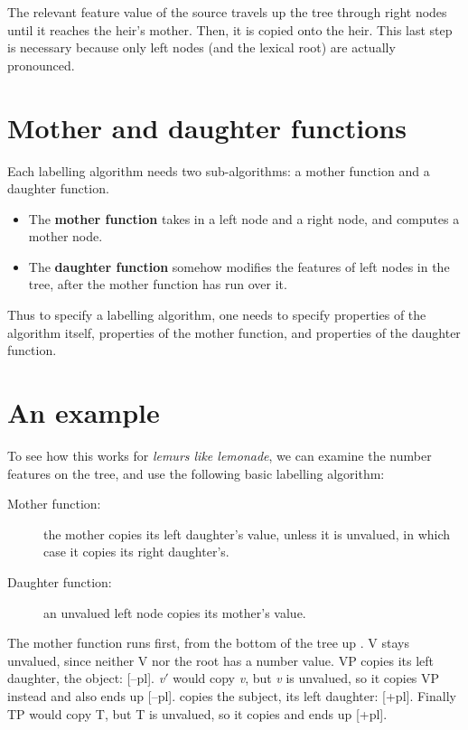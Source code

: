 The relevant feature value of the source travels up the tree through right nodes until it reaches the heir's mother. Then, it is copied onto the heir. This last step is necessary because only left nodes (and the lexical root) are actually pronounced. 

\section{Mother and daughter functions}

Each labelling algorithm needs two sub-algorithms: a mother function and a daughter function.

\begin{itemize}
  \item The \textbf{mother function} takes in a left node and a right node, and computes a mother node.
  \item The \textbf{daughter function} somehow modifies the features of left nodes in the tree, after the mother function has run over it.
\end{itemize}

Thus to specify a labelling algorithm, one needs to specify properties of the algorithm itself, properties of the mother function, and properties of the daughter function. 

\section{An example}\label{sec:labelling-example}

To see how this works for \textit{lemurs like lemonade}, we can examine the number features on the tree, and use the following basic labelling algorithm:

\begin{description}
  \item[Mother function:] the mother copies its left daughter's value, unless it is unvalued, in which case it copies its right daughter's.
  \item[Daughter function:] an unvalued left node copies its mother's value.
\end{description}

The mother function runs first, from the bottom of the tree up \Next. V\1 stays unvalued, since neither V nor the root has a number value. VP copies its left daughter, the object: [–pl]. \textit{v}$'$ would copy \textit{v}, but \textit{v} is unvalued, so it copies VP instead and also ends up [–pl]. \vP copies the subject, its left daughter: [+pl]. Finally TP would copy T, but T is unvalued, so it copies \vP and ends up [+pl].

